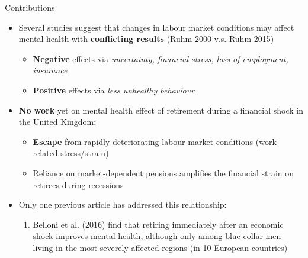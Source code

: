 \documentclass{beamer}
\begin{document}
\begin{frame}{Contributions}
    \footnotesize
\begin{itemize}
    \item<1-> Several studies suggest that changes in \begingroup\color{Blue}labour market conditions \endgroup may affect mental health with \textbf{conflicting results} \scriptsize{(\begingroup\color{lightgray}Ruhm 2000 \endgroup v.s. \begingroup\color{lightgray}Ruhm 2015\endgroup)}
\begin{itemize}
\scriptsize
    \item<2-> \textbf{Negative} effects via \textit{uncertainty, financial stress, loss of employment, insurance}
    
\item<3-> \textbf{Positive} effects via \textit{less unhealthy behaviour}
\end{itemize}
\footnotesize
    \vspace{0.3cm}
    \item<4->  \textbf{No work} yet on mental health effect of retirement during a financial shock in the \begingroup\color{Blue}United Kingdom\endgroup:
    
    \begin{itemize}
    \scriptsize
    \item<5-> \textbf{Escape} from rapidly deteriorating labour market conditions (\begingroup\color{Blue}work-related stress/strain\endgroup)
    \item<6->  \begingroup\color{Blue}Reliance on market-dependent pensions \endgroup amplifies the financial strain on retirees during recessions%
   
 \end{itemize}
  \vspace{0.25cm}
\footnotesize
 \item<7-> Only \begingroup\color{Blue}one \endgroup previous article has addressed this relationship:

 
   \vspace{0.15cm}
   
    \begin{enumerate}[$\Rightarrow$]
    \scriptsize
        \item<7->  \begingroup\color{lightgray}Belloni et al. (2016) \endgroup  find that retiring immediately after an economic shock improves mental health, although only among blue-collar men living in the most severely affected regions (in \begingroup\color{Blue}10 European countries\endgroup)
   \end{enumerate}
    
\end{itemize}   
\end{frame}
\end{document}
